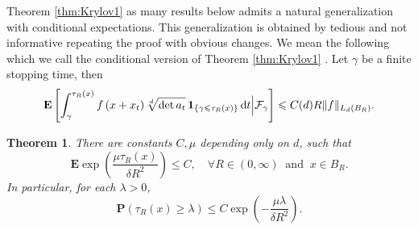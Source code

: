 \documentclass[twoside, 12pt]{book}
\numberwithin{equation}{chapter}
\newtheorem{theorem}{Theorem}[section]
\def\bE{{\mathbf E}}
\def\bP{{\mathbf P}}
\def\l{\left}
\def\r{\right}
\def\geq{\geqslant}
\def\leq{\leqslant}
\def\1{{\mathbf{1}}}
\def\d{\text{\rm{d}}}
\begin{document}
	Theorem \ref{thm:Krylov1} as many results below admits a natural generalization with conditional expectations. This generalization is obtained by tedious and not informative repeating the proof with obvious changes. We mean the following which we call the conditional version of Theorem \ref{thm:Krylov1} . Let $\gamma$ be a finite stopping time, then %
	\begin{equation}\label{eq:Kry-cond}
		\bE\left[\int_\gamma^{\tau_R(x)} f\left(x+x_t\right) \sqrt[d]{\operatorname{det} a_t} \, \1_{\{\gamma\leq \tau_R(x)\}} \, \d t \Big| \mathcal{F}_\gamma\right] \leq C(d) R\|f\|_{L_d\left(B_R\right)}. 
	\end{equation}
    \begin{theorem}\label{thm:tauR1}
		There are constants $C, \mu$ depending only on $d$, such that 
		\begin{equation}\label{eq:exp-stop1}
			\bE \exp \l(\frac{\mu {\tau_R}(x)}{\delta R^2}\r) \leq C, \quad \forall R\in(0,\infty) ~\mbox{ and }~ x\in B_R.  
        \end{equation}
		In particular, for each $\lambda>0$, 
		\begin{equation}\label{eq:stop-upper}
			\bP\left({\tau_R(x)} \geq \lambda \right) \leq C \exp \l( -\frac{\mu \lambda}{\delta R^2} \r). 
		\end{equation}
    \end{theorem}
 
\end{document}
